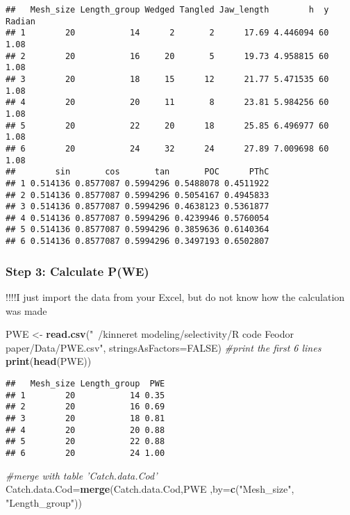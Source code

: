 \documentclass[]{article}
\newenvironment{Shaded}{\begin{snugshade}}{\end{snugshade}}
\newcommand{\KeywordTok}[1]{\textcolor[rgb]{0.13,0.29,0.53}{\textbf{#1}}}
\newcommand{\DataTypeTok}[1]{\textcolor[rgb]{0.13,0.29,0.53}{#1}}
\newcommand{\StringTok}[1]{\textcolor[rgb]{0.31,0.60,0.02}{#1}}
\newcommand{\CommentTok}[1]{\textcolor[rgb]{0.56,0.35,0.01}{\textit{#1}}}
\newcommand{\OtherTok}[1]{\textcolor[rgb]{0.56,0.35,0.01}{#1}}
\newcommand{\NormalTok}[1]{#1}
\begin{document}
\begin{verbatim}
##   Mesh_size Length_group Wedged Tangled Jaw_length        h  y Radian
## 1        20           14      2       2      17.69 4.446094 60   1.08
## 2        20           16     20       5      19.73 4.958815 60   1.08
## 3        20           18     15      12      21.77 5.471535 60   1.08
## 4        20           20     11       8      23.81 5.984256 60   1.08
## 5        20           22     20      18      25.85 6.496977 60   1.08
## 6        20           24     32      24      27.89 7.009698 60   1.08
##        sin       cos       tan       POC      PThC
## 1 0.514136 0.8577087 0.5994296 0.5488078 0.4511922
## 2 0.514136 0.8577087 0.5994296 0.5054167 0.4945833
## 3 0.514136 0.8577087 0.5994296 0.4638123 0.5361877
## 4 0.514136 0.8577087 0.5994296 0.4239946 0.5760054
## 5 0.514136 0.8577087 0.5994296 0.3859636 0.6140364
## 6 0.514136 0.8577087 0.5994296 0.3497193 0.6502807
\end{verbatim}

\subsubsection{Step 3: Calculate
P(W\textbar{}E)}\label{step-3-calculate-pwe}

!!!!I just import the data from your Excel, but do not know how the
calculation was made

\begin{Shaded}
\begin{Highlighting}[]
\NormalTok{PWE <-}\StringTok{ }\KeywordTok{read.csv}\NormalTok{(}\StringTok{"~/kinneret modeling/selectivity/R code Feodor paper/Data/PWE.csv"}\NormalTok{, }\DataTypeTok{stringsAsFactors=}\OtherTok{FALSE}\NormalTok{)}
\CommentTok{#print the first 6 lines}
\KeywordTok{print}\NormalTok{(}\KeywordTok{head}\NormalTok{(PWE))}
\end{Highlighting}
\end{Shaded}

\begin{verbatim}
##   Mesh_size Length_group  PWE
## 1        20           14 0.35
## 2        20           16 0.69
## 3        20           18 0.81
## 4        20           20 0.88
## 5        20           22 0.88
## 6        20           24 1.00
\end{verbatim}

\begin{Shaded}
\begin{Highlighting}[]
\CommentTok{#merge with table 'Catch.data.Cod'}
\NormalTok{Catch.data.Cod=}\KeywordTok{merge}\NormalTok{(Catch.data.Cod,PWE ,}\DataTypeTok{by=}\KeywordTok{c}\NormalTok{(}\StringTok{"Mesh_size"}\NormalTok{,    }\StringTok{"Length_group"}\NormalTok{))}
\end{Highlighting}
\end{Shaded}
\end{document}
